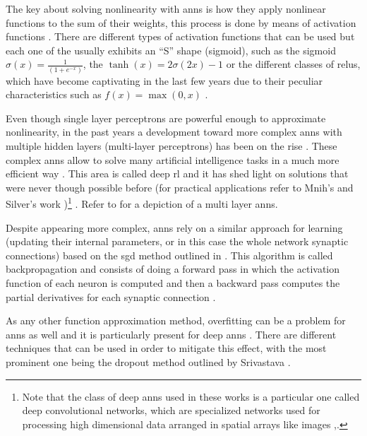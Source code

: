 \documentclass{seal_thesis}
\begin{document}
The key about solving nonlinearity with \glspl{ann} is how they apply nonlinear functions to the sum of their weights, this process is done by means of activation functions \cite[p. 216]{Sutton2017}. There are different types of activation functions that can be used but each one of the usually exhibits an ``S'' shape (\ie sigmoid), such as the sigmoid $\sigma(x) = \frac{1}{(1+e^{-x})}$, the $\tanh(x) = 2\sigma(2x)-1$ or the different classes of \glspl{relu}, which have become captivating in the last few years due to their peculiar characteristics such as $f(x) = \max(0,x)$ \cite[p. 216]{Sutton2017}.


Even though single layer perceptrons are powerful enough to approximate nonlinearity, in the past years a development toward more complex \glspl{ann} with multiple hidden layers (\ie multi-layer perceptrons) has been on the rise \cite[p. 217]{Sutton2017}. These complex \glspl{ann} allow to solve many artificial intelligence tasks in a much more efficient way \cite{Bengio2009}. This area is called deep \gls{rl} and it has shed light on solutions that were never though possible before (for practical applications refer to Mnih's \cite{Mnih2015} and Silver's work \cite{Silver2016})\footnote{Note that the class of deep \glspl{ann} used in these works is a particular one called deep convolutional networks, which are specialized networks used for processing high dimensional data arranged in spatial arrays like images \cite[p. 219]{Sutton2017},\cite{Lecun1998}.} \cite{Bengio2009}. Refer to  for a depiction of a multi layer \glspl{ann}.


Despite appearing more complex, \glspl{ann} rely on a similar approach for learning (\ie updating their internal parameters, or in this case the whole network synaptic connections) based on the \gls{sgd} method outlined in  \cite[p. 217]{Sutton2017}. This algorithm is called backpropagation and consists of doing a forward pass in which the activation function of each neuron is computed and then a backward pass computes the partial derivatives for each synaptic connection \cite[p. 218]{Sutton2017}.

As any other function approximation method, overfitting can be a problem for \glspl{ann} as well and it is particularly present for deep \glspl{ann} \cite[p. 218]{Sutton2017}. There are different techniques that can be used in order to mitigate this effect, with the most prominent one being the dropout method outlined by Srivastava \cite{Srivastava2014}.
\end{document}
